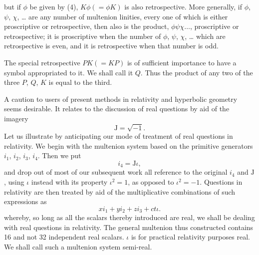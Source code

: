 \documentclass[11pt]{article}
\begin{document}
but if $\phi$ be given by (4), $K\phi(=\phi K)$ is also retrospective. More generally, if $\phi$, $\psi$, $\chi$, \ldots{} are any number of multenion linities, every one of which is either proscriptive or retrospective, then also is the product, $\phi\psi\chi\ldots$, proscriptive or retrospective; it is proscriptive when the number of $\phi$, $\psi$, $\chi$, \ldots{} which are retrospective is even, and it is retrospective when that number is odd.

\indent The special retrospective $PK(=KP)$ is of sufficient importance to have a symbol appropriated to it. We shall call it $Q$. Thus the product of any two of the three $P$, $Q$, $K$ is equal to the third.

\indent A caution to users of present methods in relativity and hyperbolic geometry seems desirable. It relates to the discussion of real questions by aid of the imagery
\begin{equation}\mathrm{J}=\sqrt{-1}.\tag{6}\end{equation}
\indent Let us illustrate by anticipating our mode of treatment of real questions in relativity. We begin with the multenion system based on the primitive generators $i_1$, $i_2$, $i_3$, $i_4$. Then we put
\begin{equation}i_4=\mathrm{J}\iota,\tag{7}\end{equation}
and drop out of most of our subsequent work all reference to the original $i_4$ and $\mathrm{J}$, using $\iota$ instead with its property $\iota^2=1$, as opposed to $\iota^2=-1$. Questions in relativity are then treated by aid of the multiplicative combinations of such expressions as
\begin{equation}xi_1+yi_2+zi_3+ct\iota.\tag{8}\end{equation}
whereby, so long as all the scalars thereby introduced are real, we shall be dealing with real questions in relativity. The general multenion thus constructed contains 16 and not 32 independent real scalars. $\iota$ is for practical relativity purposes real. We shall call such a multenion system semi-real.
\end{document}
